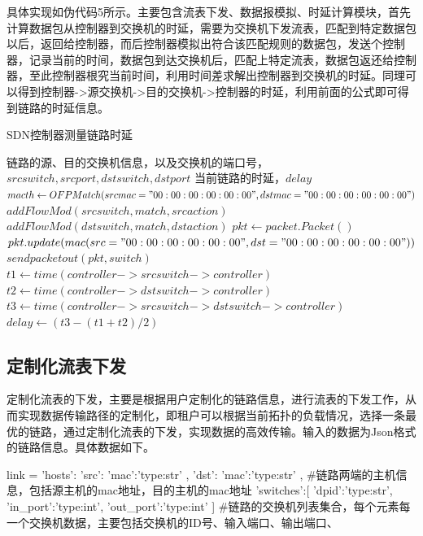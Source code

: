 具体实现如伪代码5所示。主要包含流表下发、数据报模拟、时延计算模块，首先计算数据包从控制器到交换机的时延，需要为交换机下发流表，匹配到特定数据包以后，返回给控制器，而后控制器模拟出符合该匹配规则的数据包，发送个控制器，记录当前的时间，数据包到达交换机后，匹配上特定流表，数据包返还给控制器，至此控制器根究当前时间，利用时间差求解出控制器到交换机的时延。同理可以得到控制器->源交换机->目的交换机->控制器的时延，利用前面的公式即可得到链路的时延信息。

\begin{algorithm}[!htb]
    \caption{SDN控制器测量链路时延}
    \begin{algorithmic}[1] %
        \Require 链路的源、目的交换机信息，以及交换机的端口号，$srcswitch,srcport,dstswitch,dstport$
        \Ensure 当前链路的时延，$delay$
        	\State $macth \gets OFPMatch(srcmac="00:00:00:00:00:00",dstmac="00:00:00:00:00:00")$
        	\State $addFlowMod(srcswitch,match,srcaction)$
        	\State $addFlowMod(dstswitch,match,dstaction)$
        \EndFunction
        	\State $pkt \gets packet.Packet()$
        	\State $pkt.update(mac(src="00:00:00:00:00:00",dst="00:00:00:00:00:00"))$
        	\State $sendpacketout(pkt, switch)$
        \EndFunction
         	\State $t1 \gets time(controller->srcswitch->controller)$
         	\State $t2 \gets time(controller->dstswitch->controller)$
         	\State $t3 \gets time(controller->srcswitch->dstswitch->controller)$
         	\State $delay \gets (t3-(t1+t2)/2)$
         	\State {}
        \EndFunction
    \end{algorithmic}
\end{algorithm}

\subsection{定制化流表下发}
定制化流表的下发，主要是根据用户定制化的链路信息，进行流表的下发工作，从而实现数据传输路径的定制化，即租户可以根据当前拓扑的负载情况，选择一条最优的链路，通过定制化流表的下发，实现数据的高效传输。输入的数据为Json格式的链路信息。具体数据如下。

\begin{python} 
link = {
	'hosts':{
		'src':{
			'mac':'type:str'
		},
		'dst':{
			'mac':'type:str'
		}
	}, #链路两端的主机信息，包括源主机的mac地址，目的主机的mac地址
	'switches':[
		{
			'dpid':'type:str',
			'in_port':'type:int',
			'out_port':'type:int'
		}
	] #链路的交换机列表集合，每个元素每一个交换机数据，主要包括交换机的ID号、输入端口、输出端口、
}
\end{python}

